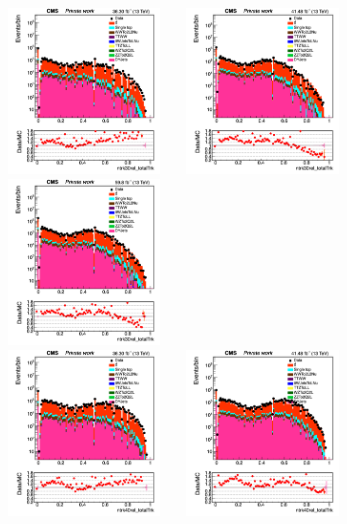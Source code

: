 \documentclass{cernatlasnote}
\begin{document}
  
  \begin{figure}[htp]
\centering
\includegraphics[width=4.6cm, height=4.4cm]{images/emu_channel/2016/16_Range_0pt2_1pt8/track_ntrk30reltot_TRK_Log.png}
\includegraphics[width=4.6cm, height=4.4cm]{images/emu_channel/2017/17_Range_0pt2_1pt8/track_ntrk30reltot_TRK_Log.png}
 \includegraphics[width=4.6cm, height=4.4cm]{images/emu_channel/2018/18_Range_0pt2_1pt8/track_ntrk30reltot_TRK_Log.png}\\
 \includegraphics[width=4.6cm, height=4.4cm]{images/emu_channel/2016/16_Range_0pt2_1pt8/track_ntrk40reltot_TRK_Log.png}
\includegraphics[width=4.6cm, height=4.4cm]{images/emu_channel/2017/17_Range_0pt2_1pt8/track_ntrk40reltot_TRK_Log.png}

\end{figure}
\end{document}
